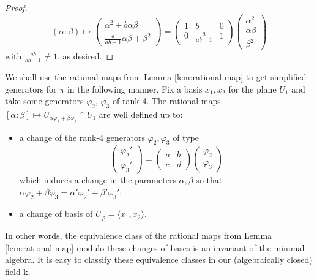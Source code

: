 \documentclass[10pt,reqno]{amsart}
\newcommand{\la}{\langle}
\newcommand{\ra}{\rangle}
\renewcommand{\a}{\alpha}
\renewcommand{\b}{\beta}
\newcommand{\f}{\varphi}
\newcommand{\kk}{\mathrm{k}}
\theoremstyle{definition}
\begin{document}
\begin{proof}
\[
(\a: \b) \mapsto 
\begin{pmatrix}
    \a^2+b\a \b \\
    \tfrac{a}{ab-1} \a \b+\b^2
\end{pmatrix}
=
\begin{pmatrix}
    1 & b & 0 \\
    0 & \tfrac{a}{ab-1} & 1
\end{pmatrix} 
\begin{pmatrix}
    \a^2 \\
    \a \b \\
    \b^2
\end{pmatrix}
\]
with $\tfrac{ab}{ab-1} \ne 1$, as desired.
\end{proof}


\noindent We shall use the rational maps from Lemma \ref{lem:rational-map} to get simplified generators for $\pi$ in the following manner. Fix a basis $x_1, x_2$ for the plane $U_1$ and take some generators $\f_2$, $\f_3$ of rank 4. The rational maps $[\a:\b] \mapsto U_{\a\f_2+\b \f_3} \cap U_1$ are well defined up to:
\begin{itemize}
    \item a change of the rank-4 generators $\f_2, \f_3$ of type
    \[
    \begin{pmatrix}
        \f_2' \\
        \f_3'
    \end{pmatrix} 
    =
    \begin{pmatrix}
        a & b \\
        c & d
    \end{pmatrix}
    \begin{pmatrix}
        \f_2 \\
        \f_3
    \end{pmatrix}
    \]
    which induces a change in the parameters $\a, \b$ so that $\a \f_2+\b \f_3=\a' \f_2' + \b' \f_3'$;
    \medskip
    \item a change of basis of $U_{\f}=\la x_1, x_2 \ra$. 
\end{itemize}  
In other words, the equivalence class of the rational maps from Lemma \ref{lem:rational-map} modulo these changes of bases is an invariant of the minimal algebra. It is easy to classify these equivalence classes in our (algebraically closed) field $\kk$.
\end{document}
